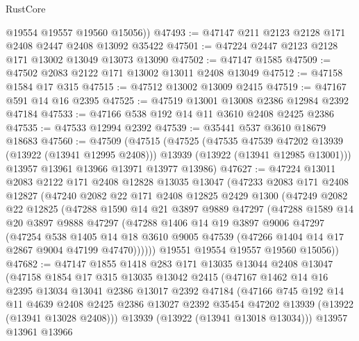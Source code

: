 \begin{lexlean}{RustCore}
\begin{coremodule}
        @19554
        @19557
        @19560
        @15056))
@47493 := @47147 @211 @2123 @2128 @171 @2408 @2447 @2408 @13092 @35422
@47501 := @47224 @2447 @2123 @2128 @171 @13002 @13049 @13073 @13090
@47502 := @47147 @1585
@47509 := @47502 @2083 @2122 @171 @13002 @13011 @2408 @13049
@47512 := @47158 @1584 @17 @315
@47515 := @47512 @13002 @13009 @2415
@47519 := @47167 @591 @14 @16 @2395
@47525 := @47519 @13001 @13008 @2386 @12984 @2392 @47184
@47533 := @47166 @538 @192 @14 @11 @3610 @2408 @2425 @2386
@47535 := @47533 @12994 @2392
@47539 := @35441 @537 @3610 @18679 @18683
@47560 := @47509
    (@47515
      (@47525
        (@47535 @47539 @47202 @13939 (@13922 (@13941 @12995 @2408)))
        @13939
        (@13922 (@13941 @12985 @13001)))
      @13957
      @13961
      @13966
      @13971
      @13977
      @13986)
@47627 := @47224
    @13011
    @2083
    @2122
    @171
    @2408
    @12828
    @13035
    @13047
    (@47233
      @2083
      @171
      @2408
      @12827
      (@47240
        @2082
        @22
        @171
        @2408
        @12825
        @2429
        @1300
        (@47249
          @2082
          @22
          @12825
          (@47288
            @1590
            @14
            @21
            @3897
            @9889
            @47297
            (@47288
              @1589
              @14
              @20
              @3897
              @9888
              @47297
              (@47288
                @1406
                @14
                @19
                @3897
                @9006
                @47297
                (@47254
                  @538
                  @1405
                  @14
                  @18
                  @3610
                  @9005
                  @47539
                  (@47266 @1404 @14 @17 @2867 @9004 @47199 @47470))))))
        @19551
        @19554
        @19557
        @19560
        @15056))
@47682 := @47147
    @1855
    @1418
    @283
    @171
    @13035
    @13044
    @2408
    @13047
    (@47158
      @1854
      @17
      @315
      @13035
      @13042
      @2415
      (@47167
        @1462
        @14
        @16
        @2395
        @13034
        @13041
        @2386
        @13017
        @2392
        @47184
        (@47166
          @745
          @192
          @14
          @11
          @4639
          @2408
          @2425
          @2386
          @13027
          @2392
          @35454
          @47202
          @13939
          (@13922 (@13941 @13028 @2408)))
        @13939
        (@13922 (@13941 @13018 @13034)))
      @13957
      @13961
      @13966

\end{coremodule}
\end{lexlean}
